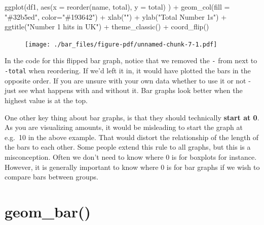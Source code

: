 \documentclass[
  letterpaper,
  DIV=11,
  numbers=noendperiod]{scrreprt}
\newenvironment{Shaded}{\begin{snugshade}}{\end{snugshade}}
\newcommand{\AttributeTok}[1]{\textcolor[rgb]{0.40,0.45,0.13}{#1}}
\newcommand{\FunctionTok}[1]{\textcolor[rgb]{0.28,0.35,0.67}{#1}}
\newcommand{\NormalTok}[1]{\textcolor[rgb]{0.00,0.23,0.31}{#1}}
\newcommand{\SpecialCharTok}[1]{\textcolor[rgb]{0.37,0.37,0.37}{#1}}
\newcommand{\StringTok}[1]{\textcolor[rgb]{0.13,0.47,0.30}{#1}}
\begin{document}
\begin{Shaded}
\begin{Highlighting}[]
\FunctionTok{ggplot}\NormalTok{(df1, }\FunctionTok{aes}\NormalTok{(}\AttributeTok{x =} \FunctionTok{reorder}\NormalTok{(name, total), }\AttributeTok{y =}\NormalTok{ total) ) }\SpecialCharTok{+} 
  \FunctionTok{geom\_col}\NormalTok{(}\AttributeTok{fill =} \StringTok{"\#32b5ed"}\NormalTok{, }\AttributeTok{color=}\StringTok{"\#193642"}\NormalTok{) }\SpecialCharTok{+}
  \FunctionTok{xlab}\NormalTok{(}\StringTok{""}\NormalTok{) }\SpecialCharTok{+}
  \FunctionTok{ylab}\NormalTok{(}\StringTok{"Total Number 1\textquotesingle{}s"}\NormalTok{) }\SpecialCharTok{+}
  \FunctionTok{ggtitle}\NormalTok{(}\StringTok{"Number 1 hits in UK"}\NormalTok{) }\SpecialCharTok{+}
  \FunctionTok{theme\_classic}\NormalTok{() }\SpecialCharTok{+}
  \FunctionTok{coord\_flip}\NormalTok{()}
\end{Highlighting}
\end{Shaded}

\begin{figure}[H]

{\centering \texttt{[image: ./bar\_files/figure-pdf/unnamed-chunk-7-1.pdf]}

}

\end{figure}

In the code for this flipped bar graph, notice that we removed the
\texttt{-} from next to \texttt{-total} when reordering. If we'd left it
in, it would have plotted the bars in the opposite order. If you are
unsure with your own data whether to use it or not - just see what
happens with and without it. Bar graphs look better when the highest
value is at the top.

One other key thing about bar graphs, is that they should technically
\textbf{start at 0}. As you are visualizing amounts, it would be
misleading to start the graph at e.g.~10 in the above example. That
would distort the relationship of the length of the bars to each other.
Some people extend this rule to all graphs, but this is a misconception.
Often we don't need to know where 0 is for boxplots for instance.
However, it is generally important to know where 0 is for bar graphs if
we wish to compare bars between groups.

\hypertarget{geom_bar}{%
\section{\texorpdfstring{\textbf{geom\_bar()}}{geom\_bar()}}\label{geom_bar}}
\end{document}
